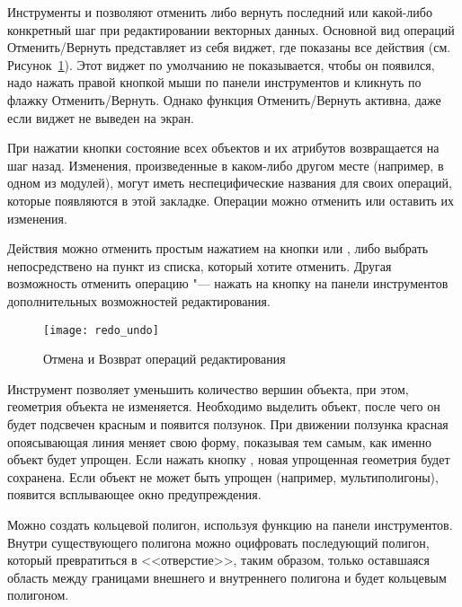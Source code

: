 
Инструменты  и
 позволяют отменить либо вернуть
последний или какой-либо конкретный шаг при редактировании векторных данных.
Основной вид операций Отменить/Вернуть представляет из себя виджет, где
показаны все действия (см. Рисунок~\ref{fig:vector_redoundo}). Этот виджет
по умолчанию не показывается, чтобы он появился, надо нажать правой кнопкой
мыши по панели инструментов и кликнуть по флажку Отменить/Вернуть. Однако
функция Отменить/Вернуть активна, даже если виджет не выведен на экран.

При нажатии кнопки  состояние всех объектов и их атрибутов
возвращается на шаг назад. Изменения, произведенные в каком-либо другом
месте (например, в одном из модулей), могут иметь неспецифические названия
для своих операций, которые появляются в этой закладке. Операции можно
отменить или оставить их изменения.

Действия можно отменить простым нажатием на кнопки  или
, либо выбрать непосредствено на пункт из списка, который
хотите отменить. Другая возможность отменить операцию "--- нажать на кнопку
 на панели инструментов дополнительных возможностей
редактирования.

\begin{figure}[ht]
   \centering
   \texttt{[image: redo\_undo]}
   \caption{Отмена и Возврат операций редактирования \wincaption}\label{fig:vector_redoundo}
\end{figure}


Инструмент  позволяет уменьшить
количество вершин объекта, при этом, геометрия объекта не изменяется.
Необходимо выделить объект, после чего он будет подсвечен красным и появится
ползунок. При движении ползунка красная опоясывающая линия меняет свою форму,
показывая тем самым, как именно объект будет упрощен. Если нажать кнопку ,
новая упрощенная геометрия будет сохранена. Если объект не может быть
упрощен (например, мультиполигоны), появится всплывающее окно предупреждения.


Можно создать кольцевой полигон, используя функцию
 на панели инструментов. Внутри
существующего полигона можно оцифровать последующий полигон, который
превратиться в <<отверстие>>, таким образом, только оставшаяся область
между границами внешнего и внутреннего полигона и будет кольцевым полигоном.


